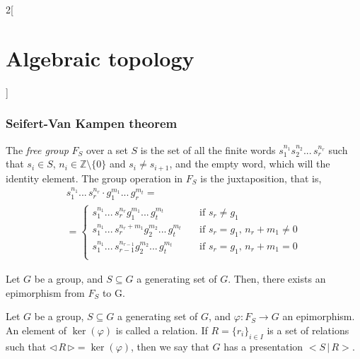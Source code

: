 \documentclass[../../../main_math.tex]{subfiles}
\begin{document}
\begin{multicols}{2}[\section{Algebraic topology}]
  \subsubsection{Seifert-Van Kampen theorem}
  \begin{definition}
    The \emph{free group} $F_S$ over a set $S$ is the set of all the finite words $s_1^{n_1}s_2^{n_2}...\,s_r^{n_r}$ such that $s_i \in S$, $n_i \in \mathbb{Z}\setminus\{0\}$ and $s_i \neq s_{i+1}$, and the empty word, which will the identity element. The group operation in $F_S$ is the juxtaposition, that is,
    \begin{multline*}
      s_1^{n_1}...\,s_r^{n_r} \cdot g_1^{m_1}...\,g_r^{m_t}=\\
      = \begin{cases}
        s_1^{n_1}...\,s_r^{n_r}g_1^{m_1}...\,g_t^{m_t}         & \quad\text{if  } s_r\neq g_1                      \\
        s_1^{n_1}...\,s_r^{n_r+m_1}g_2^{m_2}...\,g_t^{m_t}     & \quad\text{if }s_r = g_1 \text{, } n_r+m_1 \neq 0 \\
        s_1^{n_1}...\,s_{r-1}^{n_{r-1}}g_2^{m_2}...\,g_t^{m_t} & \quad\text{if }s_r = g_1 \text{, } n_r+m_1 = 0    \\
      \end{cases}
    \end{multline*}

  \end{definition}


  \begin{proposition}
    Let $G$ be a group, and $S\subseteq G$ a generating set of $G$. Then, there exists an epimorphism from $F_S$ to G.
  \end{proposition}

  \begin{definition}
    Let $G$ be a group, $S\subseteq G$ a generating set of $G$, and $\varphi:F_S\to G$ an epimorphism. An element of $\ker(\varphi)$ is called a relation. If $R=\{r_i\}_{i\in I}$ is a set of relations such that $\triangleleft \, R \, \triangleright = \ker(\varphi)$, then we say that $G$ has a presentation $< S \, | \, R >$.
  \end{definition}


\end{multicols}
\end{document}
